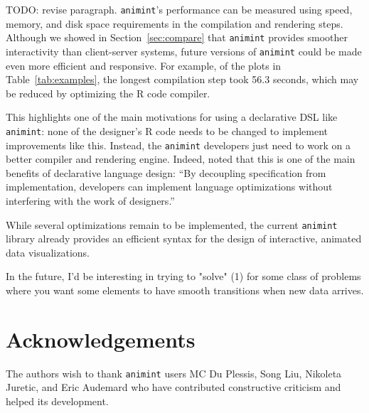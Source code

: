 \documentclass[12pt]{article}\usepackage[]{graphicx}\usepackage[]{color}
\begin{document}
TODO: revise paragraph. \texttt{animint}'s performance can be measured using
speed, memory, and disk space requirements in the compilation and
rendering steps. Although we showed in Section~\ref{sec:compare} that
\texttt{animint} provides smoother interactivity than client-server systems,
future versions of \texttt{animint} could be made even more efficient and
responsive. For example, of the plots in Table~\ref{tab:examples}, the
longest compilation step took 56.3 seconds, which may be reduced by
optimizing the R code compiler.

This highlights one of the main motivations for using a declarative
DSL like \texttt{animint}: none of the designer's R code needs to be changed to
implement improvements like this. Instead, the \texttt{animint} developers just
need to work on a better compiler and rendering engine. Indeed,
\citet{declarative} noted that this is one of the main benefits of
declarative language design: ``By decoupling specification from
implementation, developers can implement language optimizations
without interfering with the work of designers.''

While several
optimizations remain to be implemented, the current \texttt{animint} library
already provides an efficient syntax for the design of interactive,
animated data visualizations.

In the future, I'd be interesting in trying to "solve" (1) for some
class of problems where you want some elements to have smooth
transitions when new data arrives.

\section*{Acknowledgements}

The authors wish to thank \texttt{animint} users MC Du Plessis, Song Liu,
Nikoleta Juretic, and Eric Audemard
who have contributed constructive criticism and helped its development.

%



\end{document}
